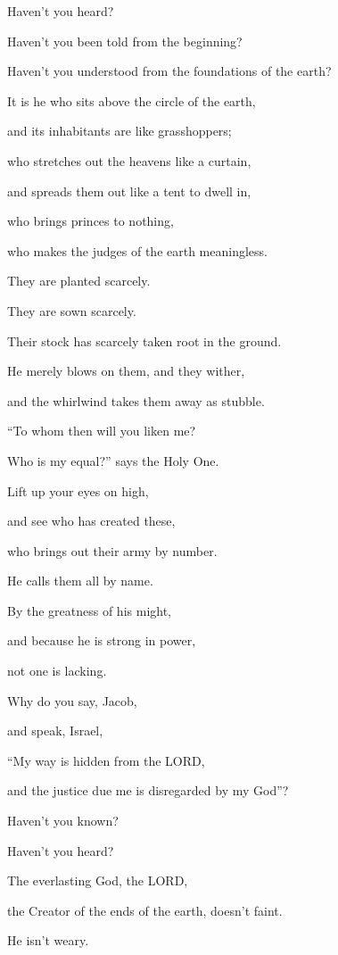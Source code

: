Haven’t you heard?

Haven’t you been told from the beginning?

Haven’t you understood from the foundations of the earth?

\myverse{}It is he who sits above the circle of the earth,

and its inhabitants are like grasshoppers;

who stretches out the heavens like a curtain,

and spreads them out like a tent to dwell in,

\myverse{}who brings princes to nothing,

who makes the judges of the earth meaningless.

\myverse{}They are planted scarcely.

They are sown scarcely.

Their stock has scarcely taken root in the ground.

He merely blows on them, and they wither,

and the whirlwind takes them away as stubble.


\vspace{\baselineskip} \myverse{}“To whom then will you liken me?

Who is my equal?” says the Holy One.

\myverse{}Lift up your eyes on high,

and see who has created these,

who brings out their army by number.

He calls them all by name.

By the greatness of his might,

and because he is strong in power,

not one is lacking.


\vspace{\baselineskip} \myverse{}Why do you say, Jacob,

and speak, Israel,

“My way is hidden from the LORD,

and the justice due me is disregarded by my God”?

\myverse{}Haven’t you known?

Haven’t you heard?

The everlasting God, the LORD,

the Creator of the ends of the earth, doesn’t faint.

He isn’t weary.

